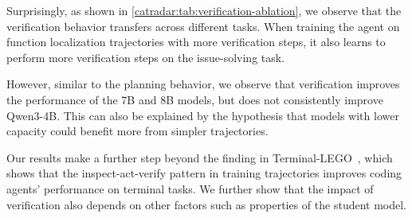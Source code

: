 Surprisingly, as shown in \autoref{catradar:tab:verification-ablation}, we observe that the verification behavior transfers across different tasks.
When training the agent on function localization trajectories with more verification steps, it also learns to perform more verification steps on the issue-solving task.

However, similar to the planning behavior, we observe that verification improves the performance of the 7B and 8B models, but does not consistently improve Qwen3-4B.
This can also be explained by the hypothesis that models with lower capacity could benefit more from simpler trajectories.

Our results make a further step beyond the finding in Terminal-LEGO~\citep{terminal-lego}, which shows that the inspect-act-verify pattern in training trajectories improves coding agents' performance on terminal tasks.
We further show that the impact of verification also depends on other factors such as properties of the student model.



